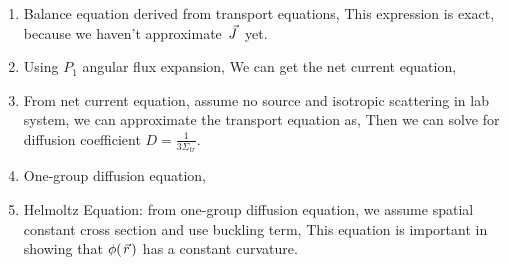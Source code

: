 \documentclass{school-22.211-notes}
\begin{document}
\clearpage
{}
\begin{enumerate}
\item Balance equation derived from transport equations,
This expression is exact, because we haven't approximate $\left.\vec{J}\right.$ yet. 

\item Using $P_1$ angular flux expansion,
  We can get the net current equation,

\item From net current equation, assume no source and isotropic scattering in lab system, we can approximate the transport equation as, 
  Then we can solve for diffusion coefficient $D = \frac{1}{3 \Sigma_{tr}}$. 

\item One-group diffusion equation,

\item Helmoltz Equation: from one-group diffusion equation, we assume spatial constant cross section and use buckling term, 
  This equation is important in showing that $\phi(\left.\vec{r}\right.)$ has a constant curvature. 
\end{enumerate}
\end{document}
